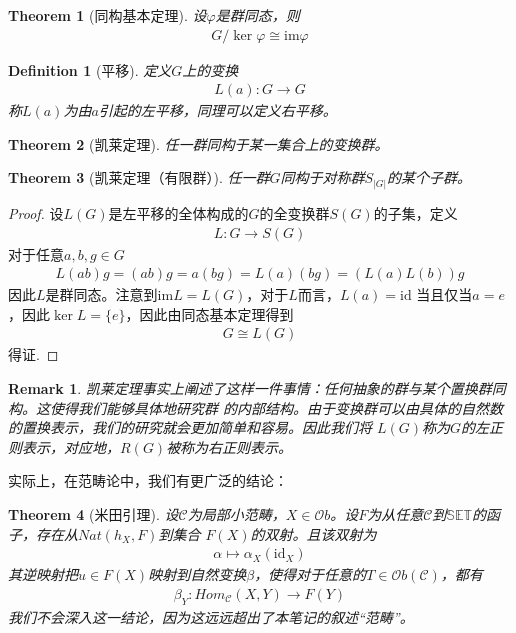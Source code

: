 \documentclass[12pt,a4paper,UTF8]{ctexbook}
\theoremstyle{plain}
\newtheorem{theorem}{\indent Theorem}[section]
\newtheorem{definition}{\indent Definition}[section]
\newtheorem{remark}{\indent Remark}[section]
\begin{document}
\begin{theorem}[同构基本定理]
设$\varphi$是群同态，则
\begin{align*} 
    G/\ker \varphi \cong \mathrm{im} \varphi
\end{align*}
\end{theorem}
\begin{definition}[平移]
    定义$G$上的变换
    \begin{align*} 
    L(a):G \to G
    \end{align*}
    称$L(a)$为由$a$引起的左平移，同理可以定义右平移。
\end{definition}
\begin{theorem}[凯莱定理]
任一群同构于某一集合上的变换群。
\end{theorem}
\begin{theorem}[凯莱定理（有限群）]
任一群$G$同构于对称群$S_{|G|}$的某个子群。
\end{theorem}
\begin{proof} 
    设$L(G)$是左平移的全体构成的$G$的全变换群$S(G)$的子集，定义
    \begin{align*} 
    L:G \to S(G)
    \end{align*}
    对于任意$a,b,g\in G$
    \begin{align*} 
    L(ab)g = (ab)g = a(bg) = L(a)(bg) = (L(a)L(b))g
    \end{align*}
    因此$L$是群同态。注意到$\mathrm{im}L = L(G)$，对于$L$而言，$L(a) = \mathrm{id}$ 当且仅当$a = e$，因此$\ker L = \{e\}$，因此由同态基本定理得到
    \begin{align*} 
    G\cong L(G)
    \end{align*}
    得证.
\end{proof}
\begin{remark}
    凯莱定理事实上阐述了这样一件事情：任何抽象的群与某个置换群同构。这使得我们能够具体地研究群
    的内部结构。由于变换群可以由具体的自然数的置换表示，我们的研究就会更加简单和容易。因此我们将
    $L(G)$称为$G$的左正则表示，对应地，$R(G)$被称为右正则表示。
\end{remark}
实际上，在范畴论中，我们有更广泛的结论：
\begin{theorem}[米田引理]
设$\mathcal{C}$为局部小范畴，$X\in \mathcal{O}b$。设$F$为从任意$\mathcal{C}$到$\mathbb{SET}$的函子，存在从$Nat(h_X,F)$到集合
$F(X)$的双射。且该双射为
\begin{align*} 
    \alpha \mapsto \alpha_X(\mathrm{id}_X)
\end{align*}
其逆映射把$u\in F(X)$映射到自然变换$\beta$，使得对于任意的$T\in \mathcal{O}b(\mathcal{C})$，都有
\begin{align*} 
    \beta_Y:Hom_{\mathcal{C}}(X,Y)\to F(Y)
\end{align*}
我们不会深入这一结论，因为这远远超出了本笔记的叙述“范畴”。
\end{theorem}
\end{document}
